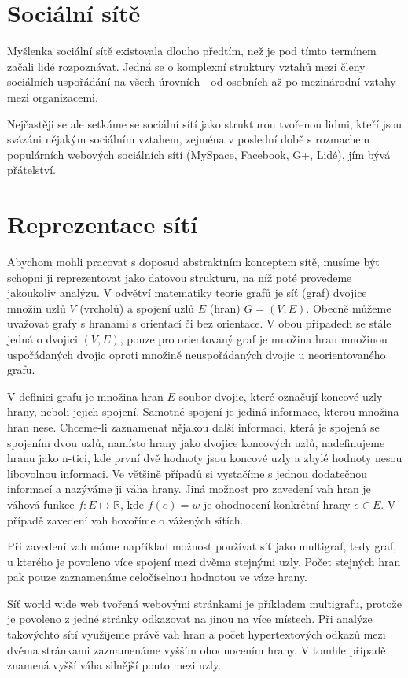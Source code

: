 \documentclass[12pt,titlepage]{report}
\begin{document}
\section{Sociální sítě}
Myšlenka sociální sítě existovala dlouho předtím, než je pod tímto termínem
začali lidé rozpoznávat. Jedná se o komplexní struktury vztahů mezi členy
sociálních uspořádání na všech úrovních - od osobních až po mezinárodní vztahy
mezi organizacemi.

Nejčastěji se ale setkáme se sociální sítí jako strukturou tvořenou lidmi,
kteří jsou svázáni nějakým sociálním vztahem, zejména v poslední době s
rozmachem populárních webových sociálních sítí (MySpace, Facebook, G+, Lidé),
jím bývá přátelství.

\section{Reprezentace sítí}
Abychom mohli pracovat s doposud abstraktním konceptem sítě, musíme být schopni
ji reprezentovat jako datovou strukturu, na níž poté provedeme jakoukoliv
analýzu.
V odvětví matematiky teorie grafů je síť (graf) dvojice množin uzlů $V$
(vrcholů) a spojení uzlů $E$ (hran) $G = (V, E)$.  Obecně můžeme uvažovat grafy
s hranami s orientací či bez orientace. V obou případech se stále jedná o
dvojici $(V, E)$, pouze pro orientovaný graf je množina hran množinou
uspořádaných dvojic oproti množině neuspořádaných dvojic u neorientovaného
grafu.

V definici grafu je množina hran $E$ soubor dvojic, které označují koncové uzly
hrany, neboli jejich spojení. Samotné spojení je jediná informace, kterou
množina hran nese. Chceme-li zaznamenat nějakou další informaci, která je
spojená se spojením dvou uzlů, namísto hrany jako dvojice koncových uzlů,
nadefinujeme hranu jako n-tici, kde první dvě hodnoty jsou koncové uzly a zbylé
hodnoty nesou libovolnou informaci. Ve většině případů si vystačíme s jednou
dodatečnou informací a nazýváme ji váha hrany. Jiná možnost pro zavedení vah
hran je váhová funkce $f: E \mapsto \mathbb{R}$, kde $f(e) = w$ je ohodnocení
konkrétní hrany $e \in E$. V případě zavedení vah hovoříme o vážených sítích.

Při zavedení vah máme například možnost používat síť jako multigraf, tedy graf,
u kterého je povoleno více spojení mezi dvěma stejnými uzly. Počet stejných
hran pak pouze zaznamenáme celočíselnou hodnotou ve váze hrany.

Síť world wide web tvořená webovými stránkami je příkladem
multigrafu, protože je povoleno z jedné stránky odkazovat na jinou na více
místech. Při analýze takovýchto sítí využijeme právě vah hran a počet
hypertextových odkazů mezi dvěma stránkami zaznamenáme vyšším ohodnocením
hrany. V tomhle případě znamená vyšší váha silnější pouto mezi uzly.
\end{document}
